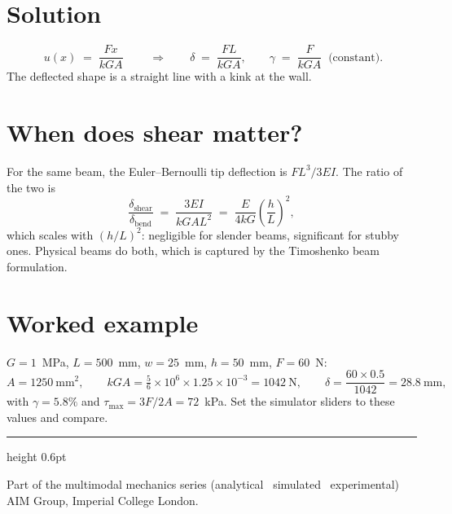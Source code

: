 \documentclass[10pt,a4paper]{article}
\begin{document}
\section*{Solution}
\begin{equation}
\boxed{\; u(x) \;=\; \frac{F x}{k G A} \;}
\qquad\Rightarrow\qquad
\delta \;=\; \frac{F L}{k G A},
\qquad
\gamma \;=\; \frac{F}{k G A} \;\; \text{(constant)} .
\end{equation}
The deflected shape is a straight line with a kink at the wall.

\section*{When does shear matter?}
For the same beam, the Euler--Bernoulli tip deflection is $F L^3 / 3EI$. The
ratio of the two is
\begin{equation}
\frac{\delta_{\text{shear}}}{\delta_{\text{bend}}}
\;=\; \frac{3 E I}{k G A L^2}
\;=\; \frac{E}{4 k G}\left(\frac{h}{L}\right)^{\!2},
\end{equation}
which scales with $(h/L)^2$: negligible for slender beams, significant for
stubby ones. Physical beams do both, which is captured by the Timoshenko beam formulation.

\section*{Worked example}
$G = 1$~MPa, $L = 500$~mm, $w = 25$~mm, $h = 50$~mm, $F = 60$~N:
\begin{equation}
A = 1250~\text{mm}^2, \qquad
kGA = \tfrac{5}{6} \times 10^6 \times 1.25\times10^{-3} = 1042~\text{N}, \qquad
\delta = \frac{60 \times 0.5}{1042} = 28.8~\text{mm},
\end{equation}
with $\gamma = 5.8\%$ and $\tau_{\max} = 3F/2A = 72$~kPa. Set the simulator
sliders to these values and compare.

\vfill
{\color{celline}\hrule height 0.6pt}
\smallskip
{\footnotesize\textcolor{celdark}{Part of the multimodal mechanics series
(analytical \textperiodcentered\ simulated \textperiodcentered\ experimental)
\,\textperiodcentered\, AIM Group, Imperial College London.}}
\end{document}
